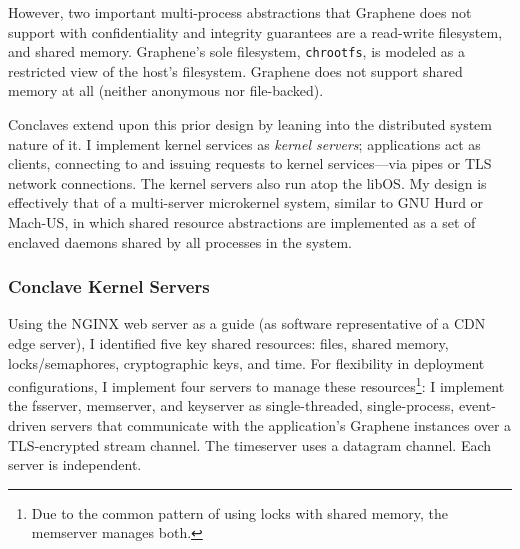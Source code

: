 
However, two important multi-process abstractions that Graphene does not support with
confidentiality and integrity guarantees are a read-write filesystem, and
shared memory.
%
Graphene's sole filesystem, \texttt{chrootfs}, is modeled as a restricted view
of the host's filesystem.
%
%
Graphene does not support shared memory at all (neither anonymous nor
file-backed).


Conclaves extend upon this prior design by leaning into the distributed
system nature of it.
%
I implement kernel services as \emph{kernel servers}; applications
act as clients, connecting to and issuing requests to kernel
services---via pipes or TLS network connections.
%
The kernel servers also run atop the libOS.
%
My design is effectively that of a multi-server microkernel system,
similar to GNU Hurd or Mach-US, in which shared resource abstractions
are implemented as a set of enclaved daemons shared by all processes in
the system.


\subsubsection{Conclave Kernel Servers}

Using the NGINX web server as a guide (as software representative of a
CDN edge server), I identified five key shared resources: files,
shared memory, locks/semaphores, cryptographic keys, and time.  
%
For flexibility in deployment configurations, I implement four servers
to manage these resources\footnote{Due to the common pattern of using
locks with shared memory, the memserver manages both.}:
%
I implement the fsserver, memserver, and keyserver as single-threaded,
single-process, event-driven servers that communicate with the application's
Graphene instances over a TLS-encrypted stream channel. 
%
The timeserver uses a datagram channel.
%
Each server is independent.


